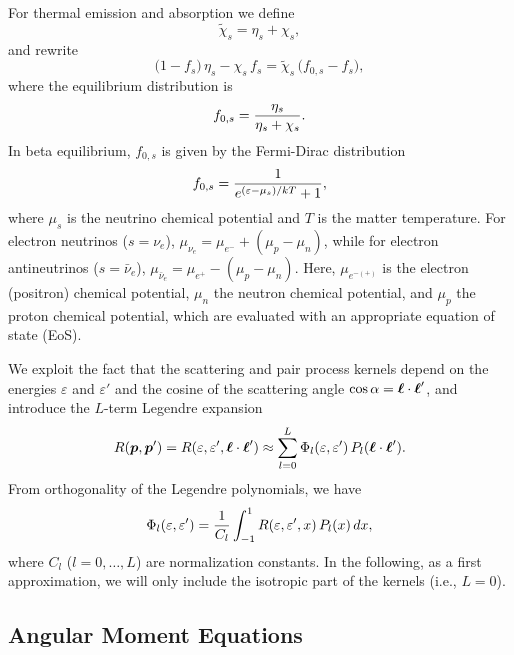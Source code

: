 \documentclass[12pt]{article}
\begin{document}
For thermal emission and absorption we define
\begin{equation}
  \tilde{\chi}_{s}=\eta_{s}+\chi_{s},
\end{equation}
and rewrite
\begin{equation}
  \big(1-f_{s}\big)\,\eta_{s}-\chi_{s}\,f_{s}
  =\tilde{\chi}_{s}\,\big(f_{0,s}-f_{s}\big),
\end{equation}
where the equilibrium distribution is
\begin{equation}
  f_{0,s}=\frac{\eta_{s}}{\eta_{s}+\chi_{s}}.  
\end{equation}
In beta equilibrium, $f_{0,s}$ is given by the Fermi-Dirac distribution
\begin{equation}
  f_{0,s}=\frac{1}{e^{(\varepsilon-\mu_{s})/kT}+1},
\end{equation}
where $\mu_{s}$ is the neutrino chemical potential and $T$ is the matter temperature.  
For electron neutrinos ($s=\nu_{e}$), $\mu_{\nu_{e}}=\mu_{e^{-}}+(\mu_{p}-\mu_{n})$, while for electron antineutrinos ($s=\bar{\nu}_{e}$), $\mu_{\bar{\nu}_{e}}=\mu_{e^{+}}-(\mu_{p}-\mu_{n})$.  
Here, $\mu_{e^{-(+)}}$ is the electron (positron) chemical potential, $\mu_{n}$ the neutron chemical potential, and $\mu_{p}$ the proton chemical potential, which are evaluated with an appropriate equation of state (EoS).  

We exploit the fact that the scattering and pair process kernels depend on the energies $\varepsilon$ and $\varepsilon'$ and the cosine of the scattering angle $\cos\alpha=\boldsymbol{\ell}\cdot\boldsymbol{\ell}'$, and introduce the $L$-term Legendre expansion
\begin{equation}
  R(\boldsymbol{p},\boldsymbol{p}')
  =R(\varepsilon,\varepsilon',\boldsymbol{\ell}\cdot\boldsymbol{\ell}')
  \approx\sum_{l=0}^{L}\Phi_{l}(\varepsilon,\varepsilon')\,P_{l}(\boldsymbol{\ell}\cdot\boldsymbol{\ell}').  
\end{equation}
From orthogonality of the Legendre polynomials, we have
\begin{equation}
  \Phi_{l}(\varepsilon,\varepsilon')
  =\frac{1}{C_{l}}\int_{-1}^{1}R(\varepsilon,\varepsilon',x)\,P_{l}(x)\,dx,
\end{equation}
where $C_{l}$ ($l=0,\ldots,L$) are normalization constants.  
In the following, as a first approximation, we will only include the isotropic part of the kernels (i.e., $L=0$).  

\subsection{Angular Moment Equations}
\end{document}
